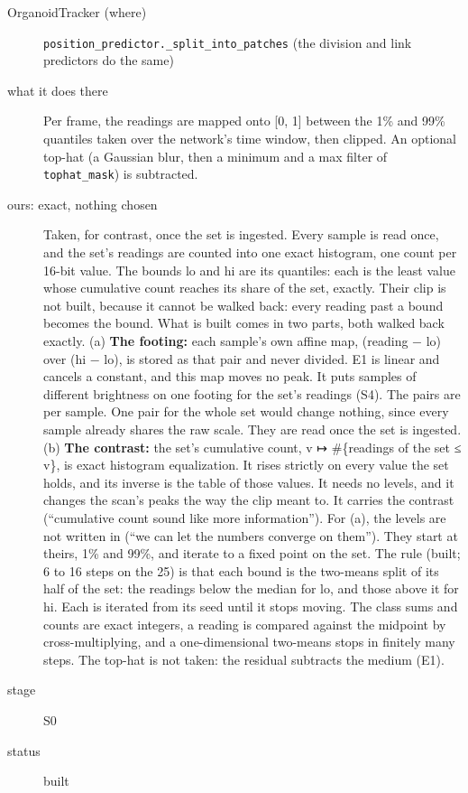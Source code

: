 \begin{description}
\item[{OrganoidTracker (where)}] \texttt{position\_\allowbreak{}predictor.\allowbreak{}\_\allowbreak{}split\_\allowbreak{}into\_\allowbreak{}patches} (the division and link predictors do the same)
\item[{what it does there}] Per frame, the readings are mapped onto [0, 1] between the 1\% and 99\% quantiles taken over the network's time window, then clipped. An optional top-hat (a Gaussian blur, then a minimum and a max filter of \texttt{tophat\_\allowbreak{}mask}) is subtracted.
\item[{ours: exact, nothing chosen}] Taken, for contrast, once the set is ingested. Every sample is read once, and the set's readings are counted into one exact histogram, one count per 16-bit value. The bounds lo and hi are its quantiles: each is the least value whose cumulative count reaches its share of the set, exactly. Their clip is not built, because it cannot be walked back: every reading past a bound becomes the bound. What is built comes in two parts, both walked back exactly. (a) \textbf{The footing:} each sample's own affine map, (reading − lo) over (hi − lo), is stored as that pair and never divided. E1 is linear and cancels a constant, and this map moves no peak. It puts samples of different brightness on one footing for the set's readings (S4). The pairs are per sample. One pair for the whole set would change nothing, since every sample already shares the raw scale. They are read once the set is ingested. (b) \textbf{The contrast:} the set's cumulative count, v ↦ \#\{readings of the set ≤ v\}, is exact histogram equalization. It rises strictly on every value the set holds, and its inverse is the table of those values. It needs no levels, and it changes the scan's peaks the way the clip meant to. It carries the contrast (“cumulative count sound like more information”). For (a), the levels are not written in (“we can let the numbers converge on them”). They start at theirs, 1\% and 99\%, and iterate to a fixed point on the set. The rule (built; 6 to 16 steps on the 25) is that each bound is the two-means split of its half of the set: the readings below the median for lo, and those above it for hi. Each is iterated from its seed until it stops moving. The class sums and counts are exact integers, a reading is compared against the midpoint by cross-multiplying, and a one-dimensional two-means stops in finitely many steps. The top-hat is not taken: the residual subtracts the medium (E1).
\item[{stage}] S0
\item[{status}] built
\end{description}

